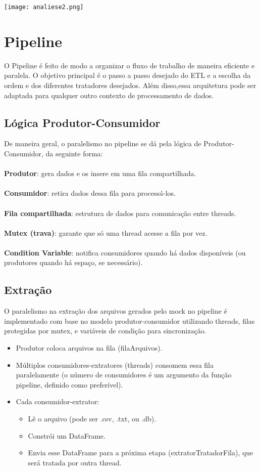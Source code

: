 \documentclass[a4paper,12pt]{article}
\begin{document}
\texttt{[image: analiese2.png]}

\section{Pipeline}
O Pipeline é feito de modo a organizar o fluxo de trabalho de maneira eficiente e paralela. O objetivo principal é o passo a passo desejado do ETL e a escolha da ordem e dos diferentes tratadores desejados. Além disso,essa arquitetura pode ser adaptada para qualquer outro contexto de processamento de dados.

\subsection*{Lógica Produtor-Consumidor}
De maneira geral, o paralelismo no pipeline se dá pela lógica de Produtor-Consumidor, da seguinte forma:
\\
\\
\textbf{Produtor}: gera dados e os insere em uma fila compartilhada.
\\
\\
\textbf{Consumidor}: retira dados dessa fila para processá-los.
\\
\\
\textbf{Fila compartilhada}: estrutura de dados para comunicação entre threads.
\\
\\
\textbf{Mutex (trava)}: garante que só uma thread acesse a fila por vez.
\\
\\
\textbf{Condition Variable}: notifica consumidores quando há dados disponíveis (ou produtores quando há espaço, se necessário).



\subsection*{Extração}
O paralelismo na extração dos arquivos gerados pelo mock no pipeline é implementado com base no modelo produtor-consumidor utilizando threads, filas protegidas por mutex, e variáveis de condição para sincronização.

\begin{itemize}
    \item Produtor coloca arquivos na fila (filaArquivos).

    \item  Múltiplos consumidores-extratores (threads) consomem essa fila paralelamente (o número de consumidores é um argumento da função pipeline, definido como preferível).

    \item  Cada consumidor-extrator:
    \begin{itemize}
        \item Lê o arquivo (pode ser .csv, .txt, ou .db).
        \item Constrói um DataFrame.
        \item Envia esse DataFrame para a próxima etapa (extratorTratadorFila), que será tratada por outra thread.
    \end{itemize}

\end{itemize}
\end{document}
